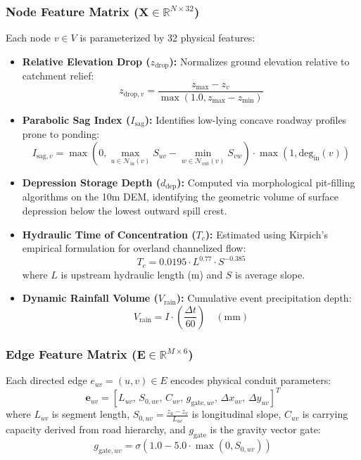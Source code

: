 \documentclass[conference]{IEEEtran}
\begin{document}
\subsubsection{Node Feature Matrix ($\mathbf{X} \in \mathbb{R}^{N \times 32}$)}
Each node $v \in V$ is parameterized by 32 physical features:
\begin{itemize}
    \item \textbf{Relative Elevation Drop ($z_{\text{drop}}$):} Normalizes ground elevation relative to catchment relief:
    \begin{equation}
    z_{\text{drop}, v} = \frac{z_{\max} - z_v}{\max(1.0, z_{\max} - z_{\min})}
    \end{equation}
    \item \textbf{Parabolic Sag Index ($I_{\text{sag}}$):} Identifies low-lying concave roadway profiles prone to ponding:
    \begin{equation}
    I_{\text{sag}, v} = \max\left(0, \max_{u \in \mathcal{N}_{\text{in}}(v)} S_{uv} - \min_{w \in \mathcal{N}_{\text{out}}(v)} S_{vw}\right) \cdot \max(1, \text{deg}_{\text{in}}(v))
    \end{equation}
    \item \textbf{Depression Storage Depth ($d_{\text{dep}}$):} Computed via morphological pit-filling algorithms on the 10m DEM, identifying the geometric volume of surface depression below the lowest outward spill crest.
    \item \textbf{Hydraulic Time of Concentration ($T_c$):} Estimated using Kirpich's empirical formulation for overland channelized flow:
    \begin{equation}
    T_c = 0.0195 \cdot L^{0.77} \cdot S^{-0.385}
    \end{equation}
    where $L$ is upstream hydraulic length (m) and $S$ is average slope.
    \item \textbf{Dynamic Rainfall Volume ($V_{\text{rain}}$):} Cumulative event precipitation depth:
    \begin{equation}
    V_{\text{rain}} = I \cdot \left(\frac{\Delta t}{60}\right) \quad (\text{mm})
    \end{equation}
\end{itemize}

\subsubsection{Edge Feature Matrix ($\mathbf{E} \in \mathbb{R}^{M \times 6}$)}
Each directed edge $e_{uv} = (u, v) \in E$ encodes physical conduit parameters:
\begin{equation}
\mathbf{e}_{uv} = \left[ L_{uv}, \, S_{0, uv}, \, C_{uv}, \, g_{\text{gate}, uv}, \, \Delta x_{uv}, \, \Delta y_{uv} \right]^T
\end{equation}
where $L_{uv}$ is segment length, $S_{0, uv} = \frac{z_u - z_v}{L_{uv}}$ is longitudinal slope, $C_{uv}$ is carrying capacity derived from road hierarchy, and $g_{\text{gate}}$ is the gravity vector gate:
\begin{equation}
g_{\text{gate}, uv} = \sigma\left(1.0 - 5.0 \cdot \max(0, S_{0, uv})\right)
\end{equation}
\end{document}
